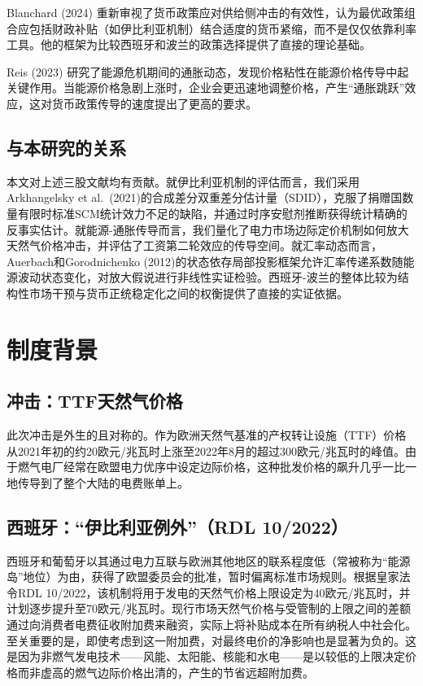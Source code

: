 \documentclass[12pt, a4paper]{article}
\begin{document}
Blanchard (2024) 重新审视了货币政策应对供给侧冲击的有效性，认为最优政策组合应包括财政补贴（如伊比利亚机制）结合适度的货币紧缩，而不是仅仅依靠利率工具。他的框架为比较西班牙和波兰的政策选择提供了直接的理论基础。

Reis (2023) 研究了能源危机期间的通胀动态，发现价格粘性在能源价格传导中起关键作用。当能源价格急剧上涨时，企业会更迅速地调整价格，产生“通胀跳跃”效应，这对货币政策传导的速度提出了更高的要求。


\subsection{与本研究的关系}

本文对上述三股文献均有贡献。就伊比利亚机制的评估而言，我们采用Arkhangelsky et al.\ (2021)的合成差分双重差分估计量（SDID），克服了捐赠国数量有限时标准SCM统计效力不足的缺陷，并通过时序安慰剂推断获得统计精确的反事实估计。就能源-通胀传导而言，我们量化了电力市场边际定价机制如何放大天然气价格冲击，并评估了工资第二轮效应的传导空间。就汇率动态而言，Auerbach和Gorodnichenko (2012)的状态依存局部投影框架允许汇率传递系数随能源波动状态变化，对放大假说进行非线性实证检验。西班牙-波兰的整体比较为结构性市场干预与货币正统稳定化之间的权衡提供了直接的实证依据。


\section{制度背景}

\subsection{冲击：TTF天然气价格}

此次冲击是外生的且对称的。作为欧洲天然气基准的产权转让设施（TTF）价格从2021年初的约20欧元/兆瓦时上涨至2022年8月的超过300欧元/兆瓦时的峰值。由于燃气电厂经常在欧盟电力优序中设定边际价格，这种批发价格的飙升几乎一比一地传导到了整个大陆的电费账单上。


\subsection{西班牙：“伊比利亚例外”（RDL 10/2022）}

西班牙和葡萄牙以其通过电力互联与欧洲其他地区的联系程度低（常被称为“能源岛”地位）为由，获得了欧盟委员会的批准，暂时偏离标准市场规则。根据皇家法令RDL 10/2022，该机制将用于发电的天然气价格上限设定为40欧元/兆瓦时，并计划逐步提升至70欧元/兆瓦时。现行市场天然气价格与受管制的上限之间的差额通过向消费者电费征收附加费来融资，实际上将补贴成本在所有纳税人中社会化。至关重要的是，即使考虑到这一附加费，对最终电价的净影响也是显著为负的。这是因为非燃气发电技术——风能、太阳能、核能和水电——是以较低的上限决定价格而非虚高的燃气边际价格出清的，产生的节省远超附加费。
\end{document}
